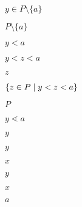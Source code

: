 \documentclass[10pt]{book}
\begin{document}
\begin{mdSnippets}
\begin{mdInlineSnippet}[22313e110fe231e36a074d8e9f449c8d]
$y \in P \setminus \{a\}$\end{mdInlineSnippet}%
\begin{mdInlineSnippet}[3713ed38086ee795098a5c0665e88a50]%
$P \setminus \{a\}$\end{mdInlineSnippet}%
\begin{mdInlineSnippet}%
$y \lt a$\end{mdInlineSnippet}%
\begin{mdInlineSnippet}[40297e3a242e493a558e827a43811cd2]%
$y \lt z \lt a$\end{mdInlineSnippet}%
\begin{mdInlineSnippet}[fbade9e36a3f36d3d676c1b808451dd7]%
$z$\end{mdInlineSnippet}%
\begin{mdInlineSnippet}[990374446420838e9d78d94962701022]%
$\{z \in P \mid y < z < a\}$\end{mdInlineSnippet}%
\begin{mdInlineSnippet}%
$P$\end{mdInlineSnippet}%
\begin{mdInlineSnippet}%
$y \lessdot a$\end{mdInlineSnippet}%
\begin{mdInlineSnippet}[415290769594460e2e485922904f345d]%
$y$\end{mdInlineSnippet}%
\begin{mdInlineSnippet}[415290769594460e2e485922904f345d]%
$y$\end{mdInlineSnippet}%
\begin{mdInlineSnippet}[9dd4e461268c8034f5c8564e155c67a6]%
$x$\end{mdInlineSnippet}%
\begin{mdInlineSnippet}[415290769594460e2e485922904f345d]%
$y$\end{mdInlineSnippet}%
\begin{mdInlineSnippet}[9dd4e461268c8034f5c8564e155c67a6]%
$x$\end{mdInlineSnippet}%
\begin{mdInlineSnippet}[0cc175b9c0f1b6a831c399e269772661]%
$a$\end{mdInlineSnippet}%

\end{mdSnippets}
\end{document}
